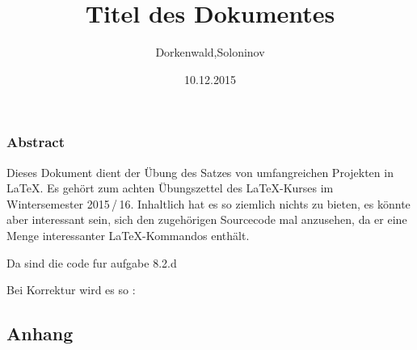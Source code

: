 \documentclass{scrreprt}
\newcommand*{\Path}{./inhalte}
\begin{document}
	\extratitle{Schmutztitel}

	\title{Titel des Dokumentes}
	\author{Dorkenwald,Soloninov}
	\date{10.12.2015}
	\maketitle

	\tableofcontents
	\newpage

	\subsection*{Abstract}
Dieses Dokument dient der Übung des Satzes von umfangreichen Projekten in \LaTeX{}. Es gehört zum achten Übungszettel des \LaTeX-Kurses im Wintersemester 	2015\,/\,16. Inhaltlich hat es so ziemlich nichts zu bieten, es könnte aber interessant sein, sich den zugehörigen Sourcecode mal anzusehen, da er eine Menge interessanter \LaTeX-Kommandos enthält.

	
			
	
	
	Da sind die code fur aufgabe 8.2.d
	 
	 
	
	
	Bei Korrektur wird es so : 


	\begin{appendix}
		\chapter*{Anhang}
		\listoffigures
		\listoftables
	\end{appendix}
\end{document}
